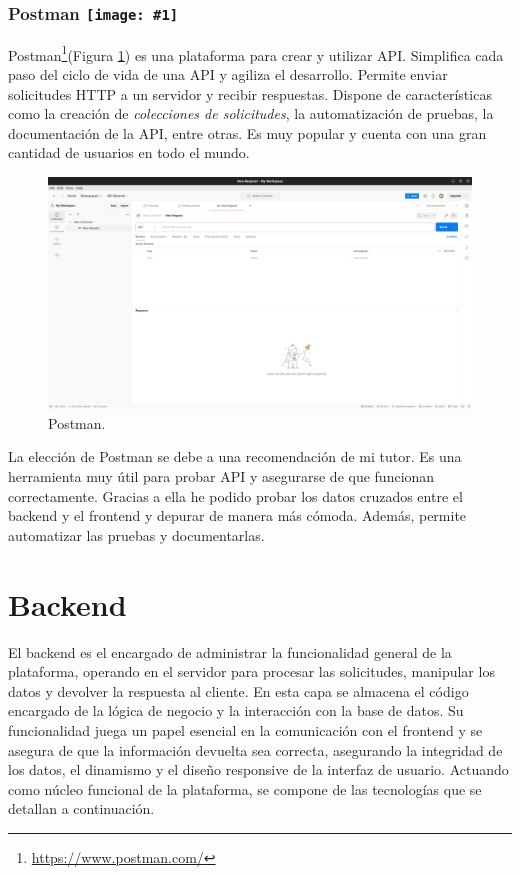 \vspace{-1cm}

\renewcommand{\icon}[1]{\texttt{[image: \#1]}}
\subsubsection*{Postman \protect\icon{./imagenes/postman_logo.png}}

Postman\footnote{\url{https://www.postman.com/}}(Figura \ref{fig:postman}) es una plataforma para crear y utilizar API. Simplifica cada paso del ciclo de vida de una API y agiliza el desarrollo. Permite enviar solicitudes HTTP a un servidor y recibir respuestas. Dispone de características como la creación de \textit{colecciones de solicitudes}, la automatización de pruebas, la documentación de la API, entre otras. Es muy popular y cuenta con una gran cantidad de usuarios en todo el mundo.\newline

\begin{figure}[H]
    \centering
    \includegraphics[width=1\textwidth]{./imagenes/postman.png}
    \caption{Postman.}
    \label{fig:postman}
\end{figure}

La elección de Postman se debe a una recomendación de mi tutor. Es una herramienta muy útil para probar API y asegurarse de que funcionan correctamente. Gracias a ella he podido probar los datos cruzados entre el backend y el frontend y depurar de manera más cómoda. Además, permite automatizar las pruebas y documentarlas.\newline


\section{Backend}
El backend es el encargado de administrar la funcionalidad general de la plataforma, operando en el servidor para procesar las solicitudes, manipular los datos y devolver la respuesta al cliente. En esta capa se almacena el código encargado de la lógica de negocio y la interacción con la base de datos. Su funcionalidad juega un papel esencial en la comunicación con el frontend y se asegura de que la información devuelta sea correcta, asegurando la integridad de los datos, el dinamismo y el diseño responsive de la interfaz de usuario. Actuando como núcleo funcional de la plataforma, se compone de las tecnologías que se detallan a continuación.\newline

